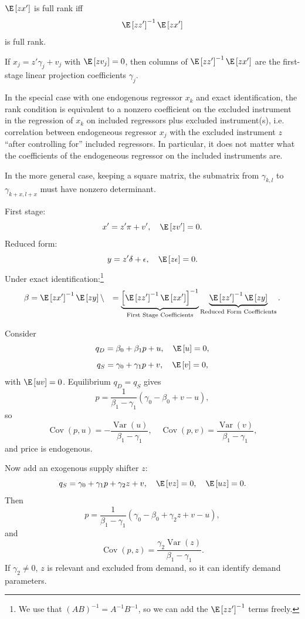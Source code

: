 \begin{remark}
	$\E\left[zx'\right]$ is full rank iff \[
		\E\left[zz'\right]^{-1}\E\left[zx'\right]
	\]
	is full rank.

	If $x_j = z'\gamma_j + v_j$ with $\E\left[zv_j\right]=0$, then columns of $\E\left[zz'\right]^{-1}\E\left[zx'\right]$ are the first-stage linear projection coefficients $\gamma_j$.


	In the special case with one endogenous regressor $x_k$ and exact identification, the rank condition is equivalent to a nonzero coefficient on the excluded instrument in the regression of $x_k$ on included regressors plus excluded instrument(s), i.e. correlation between endogeneous regressor $x_j$ with the excluded instrument $z$ ``after controlling for'' included regressors. In particular, it does not matter what the coefficients of the endogeneous regressor on the included instruments are.

	In the more general case, keeping a square matrix, the submatrix from $\gamma_{k,l}$ to $\gamma_{k+x,l+x}$ must have nonzero determinant.
\end{remark}

\begin{definition}
	First stage: \[
		x' = z'\pi + v', \quad \E\left[zv'\right]=0
	.\]
	Reduced form: \[
		y = z'\delta + \epsilon, \quad \E\left[z\epsilon\right]=0
	.\]
	Under exact identification:\footnote{We use that $\left( AB \right)^{-1} = A^{-1}B^{-1}$, so we can add the $\E\left[zz'\right] ^{-1}$ terms freely.} \begin{align*}
		\beta &= \E\left[zx'\right] ^{-1} \E\left[zy\right] \setminus 
			  &=\underbrace{\left[\E\left[zz'\right]^{-1}\E\left[zx'\right]\right]^{-1}}_{\text{First Stage Coefficients}}\underbrace{\E\left[zz'\right]^{-1}\E\left[zy\right]}_{\text{Reduced Form Coefficients}}
	.\end{align*}
\end{definition}

\begin{example}
	Consider \[
		q_D = \beta_0 + \beta_1 p + u, \quad \E\left[u\right]=0
	,\] \[
		q_S = \gamma_0 + \gamma_1 p + v, \quad \E\left[v\right]=0
	,\]
	with $\E\left[uv\right]=0$. Equilibrium $q_D=q_S$ gives \[
		p = \frac{1}{\beta_1-\gamma_1}(\gamma_0-\beta_0+v-u)
	,\]
	so \[
		\operatorname{Cov}(p,u) = -\frac{\operatorname{Var}(u)}{\beta_1-\gamma_1}, \quad \operatorname{Cov}(p,v)=\frac{\operatorname{Var}(v)}{\beta_1-\gamma_1}
	,\]
	and price is endogenous.

	Now add an exogenous supply shifter $z$: \[
		q_S = \gamma_0 + \gamma_1 p + \gamma_2 z + v, \quad \E\left[vz\right]=0, \quad \E\left[uz\right]=0
	.\]
	Then \[
		p = \frac{1}{\beta_1-\gamma_1}(\gamma_0-\beta_0+\gamma_2 z+v-u)
	,\]
	and \[
		\operatorname{Cov}(p,z) = \frac{\gamma_2\operatorname{Var}(z)}{\beta_1-\gamma_1}
	.\]
	If $\gamma_2\ne 0$, $z$ is relevant and excluded from demand, so it can identify demand parameters.
\end{example}


